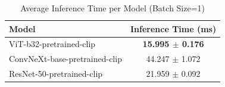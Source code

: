 \begin{table}
\caption{Average Inference Time per Model (Batch Size=1)}
\label{tab:inference_time_performance}
\begin{tabular}{l|c}
\toprule
Model & Inference Time (ms) \\
\midrule
ViT-b32-pretrained-clip & \textbf{15.995 $\pm$ 0.176} \\
ConvNeXt-base-pretrained-clip & 44.247 $\pm$ 1.072 \\
ResNet-50-pretrained-clip & 21.959 $\pm$ 0.092 \\
\bottomrule
\end{tabular}
\end{table}
